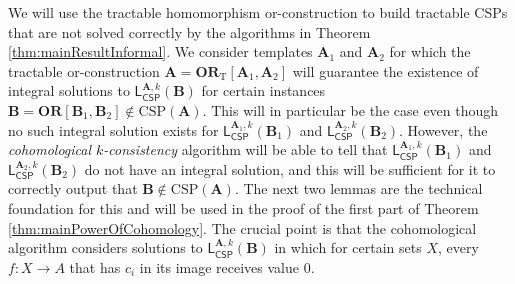 \documentclass[a4paper,english, thm-restate]{lipics-v2021}
\newcommand{\StructA}{\mathbf{A}}
\newcommand{\StructB}{\mathbf{B}}
\newcommand{\CSP}[1]{\mathrm{CSP}(#1)}
\newcommand{\leqs}{\mathsf{L}}
\newcommand{\cspiso}[3]{\leqs^{#1,#2}_{\mathsf{CSP}}(#3)}
\newcommand{\ORT}[1]{\mathbf{OR}_\text{T}[#1]}
\newcommand{\OR}[1]{\mathbf{OR}[#1]}
\begin{document}
	\noindent We will use the tractable homomorphism or-construction to build
	tractable CSPs that are not solved correctly by the algorithms in Theorem \ref{thm:mainResultInformal}.
	We consider templates $\StructA_1$ and $\StructA_2$ for which the tractable or-construction $\StructA = \ORT{\StructA_1,\StructA_2}$ will guarantee the existence of integral solutions to $\cspiso{\StructA}{k}{\StructB}$ for certain instances $\StructB = \OR{\StructB_1,\StructB_2} \notin \CSP{\StructA}$. This will in particular be the case even though no such integral solution exists for $\cspiso{\StructA_1}{k}{\StructB_1}$ and $\cspiso{\StructA_2}{k}{\StructB_2}$.
	However, the \emph{cohomological $k$-consistency} algorithm will be able to tell that $\cspiso{\StructA_1}{k}{\StructB_1}$ and $\cspiso{\StructA_2}{k}{\StructB_2}$ do not have an integral solution, and this will be sufficient for it to correctly output that $\StructB \notin \CSP{\StructA}$. The next two lemmas are the technical foundation for this and will be used in the proof of the first part of Theorem \ref{thm:mainPowerOfCohomology}.
	The crucial point is that the cohomological algorithm considers solutions to $\cspiso{\StructA}{k}{\StructB}$ in which for certain sets $X$, every $f: X \to A$ that has $c_i$ in its image receives value $0$.
	
\end{document}
